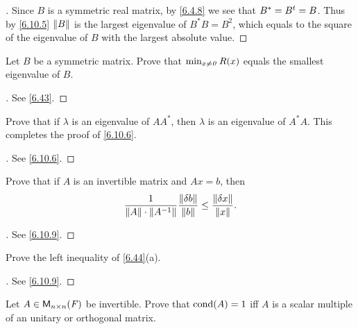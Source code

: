 \begin{proof}[]
  Since \(B\) is a symmetric real matrix, by \cref{6.4.8} we see that \(B^* = {B}^{t} = B\).
  Thus by \cref{6.10.5} \(\left\lVert B\right\rVert\) is the largest eigenvalue of \(B^* B = B^2\), which equals to the square of the eigenvalue of \(B\) with the largest absolute value.
\end{proof}

\setcounter{ex}{6}
\begin{ex}\label{ex:6.10.7}
  Let \(B\) be a symmetric matrix.
  Prove that \(\min_{x \neq \mathit{0}} R(x)\) equals the smallest eigenvalue of \(B\).
\end{ex}

\begin{proof}[]
  See \cref{6.43}.
\end{proof}

\begin{ex}\label{ex:6.10.8}
  Prove that if \(\lambda\) is an eigenvalue of \(A A^*\), then \(\lambda\) is an eigenvalue of \(A^* A\).
  This completes the proof of \cref{6.10.6}.
\end{ex}

\begin{proof}[]
  See \cref{6.10.6}.
\end{proof}

\begin{ex}\label{ex:6.10.9}
  Prove that if \(A\) is an invertible matrix and \(Ax = b\), then
  \[
    \dfrac{1}{\left\lVert A\right\rVert \cdot \left\lVert A^{-1}\right\rVert} \dfrac{\left\lVert\delta b\right\rVert}{\left\lVert b\right\rVert} \leq \dfrac{\left\lVert\delta x\right\rVert}{\left\lVert x\right\rVert}.
  \]
\end{ex}

\begin{proof}[]
  See \cref{6.10.9}.
\end{proof}

\begin{ex}\label{ex:6.10.10}
  Prove the left inequality of \cref{6.44}(a).
\end{ex}

\begin{proof}[]
  See \cref{6.10.9}.
\end{proof}

\begin{ex}\label{ex:6.10.11}
  Let \(A \in \ms[n][n][\F]\) be invertible.
  Prove that \(\cond{A} = 1\) iff \(A\) is a scalar multiple of an unitary or orthogonal matrix.
\end{ex}

